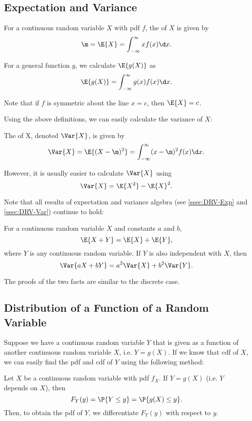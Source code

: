 \subsection{Expectation and Variance}

\begin{definition}
    For a continuous random variable $X$ with pdf $f$, the  of $X$ is given by \[\m = \E{X} = \int_{-\infty}^{\infty} x f(x) \d x.\]

    For a general function $g$, we calculate $\E{g(X)}$ as \[\E{g(X)} = \int_{-\infty}^{\infty} g(x) f(x) \d x.\]
\end{definition}

Note that if $f$ is symmetric about the line $x = c$, then $\E{X} = c$.

Using the above definitions, we can easily calculate the variance of $X$: 

\begin{definition}
    The  of X, denoted $\Var{X}$, is given by \[\Var{X} = \E{(X-\m)^2} = \int_{-\infty}^\infty (x-\m)^2 f(x) \d x.\]
\end{definition}

However, it is usually easier to calculate $\Var{X}$ using \[\Var{X} = \E{X^2} - \E{X}^2.\]

Note that all results of expectation and variance algebra (see \SS\ref{ssec:DRV-Exp} and \SS\ref{ssec:DRV-Var}) continue to hold:

\begin{fact}
    For a continuous random variable $X$ and constants $a$ and $b$, \[\E{X + Y} = \E{X} + \E{Y},\] where $Y$ is any continuous random variable. If $Y$ is also independent with $X$, then \[\Var{aX + bY} = a^2 \Var{X} + b^2 \Var{Y}.\]
\end{fact}

The proofs of the two facts are similar to the discrete case.

\subsection{Distribution of a Function of a Random Variable}

Suppose we have a continuous random variable $Y$ that is given as a function of another continuous random variable $X$, i.e. $Y = g(X)$. If we know that cdf of $X$, we can easily find the pdf and cdf of $Y$ using the following method:

\begin{recipe}
    Let $X$ be a continuous random variable with pdf $f_X$. If $Y = g(X)$ (i.e. $Y$ depends on $X$), then \[F_Y(y) = \P{Y \leq y} = \P{g(X) \leq y}.\] Then, to obtain the pdf of $Y$, we differentiate $F_Y(y)$ with respect to $y$.
\end{recipe}

